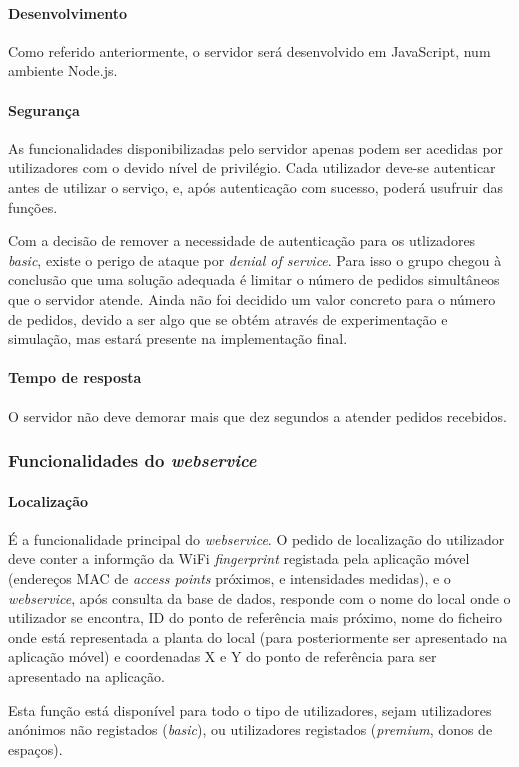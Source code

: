 \documentclass[12pt]{article} %
\begin{document}
\paragraph{Desenvolvimento}
Como referido anteriormente, o servidor será desenvolvido em JavaScript, num ambiente Node.js.\par

\paragraph{Segurança}
As funcionalidades disponibilizadas pelo servidor apenas podem ser acedidas por utilizadores com o devido nível de privilégio. Cada utilizador deve-se autenticar antes de utilizar o serviço, e, após autenticação com sucesso, poderá usufruir das funções. \par
Com a  decisão de remover a necessidade de autenticação para os utlizadores \textit{basic}, existe o perigo de ataque por \textit{denial of service}. Para isso o grupo chegou à conclusão que uma solução adequada é limitar o número de pedidos simultâneos que o servidor atende. Ainda não foi decidido um valor concreto para o número de pedidos, devido a ser algo que se obtém através de experimentação e simulação, mas estará presente na implementação final. 

\paragraph{Tempo de resposta}
O servidor não deve demorar mais que dez segundos a atender pedidos recebidos.

\pagebreak

\subsubsection{Funcionalidades do \textit{webservice}}

\paragraph{Localização}
É a funcionalidade principal do \textit{webservice}. O pedido de localização do utilizador deve conter a informção da WiFi \textit{fingerprint} registada pela aplicação móvel (endereços MAC de \textit{access points} próximos, e intensidades medidas), e o \textit{webservice}, após consulta da base de dados, responde com o nome do local onde o utilizador se encontra, ID do ponto de referência mais próximo, nome do ficheiro onde está representada a planta do local (para posteriormente ser apresentado na aplicação móvel) e coordenadas X e Y do ponto de referência para ser apresentado na aplicação.\par
Esta função está disponível para todo o tipo de utilizadores, sejam utilizadores anónimos não registados (\textit{basic}), ou utilizadores registados (\textit{premium}, donos de espaços).
\end{document}
